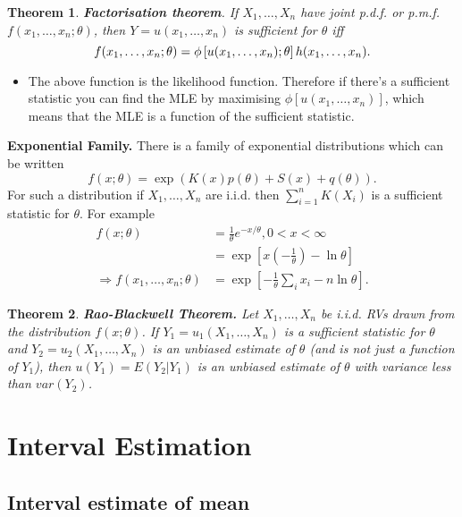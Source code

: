 \documentclass[10pt, two column]{article}
\newtheorem{theorem}{Theorem}[subsection]
\begin{document}
\begin{theorem}
{\bf Factorisation theorem}. If $X_{1}, \dots, X_{n}$ have joint p.d.f. or p.m.f. $f(x_{1}, \dots, x_{n}; \theta)$, then $Y = u(x_{1}, \dots, x_{n})$ is sufficient for $\theta$ iff \vspace{-6pt}
\[ f(x_{1}, \dots, x_{n}; \theta) = \phi \left[ u(x_{1}, \dots, x_{n}); \theta \right] h(x_{1}, \dots, x_{n}). \vspace{-6pt} \]
\end{theorem}
\begin{itemize}
\item The above function is the likelihood function. Therefore if there's a sufficient statistic you can find the MLE by maximising $\phi \left[ u(x_{1}, \dots, x_{n}) \right]$, which means that the MLE is a function of the sufficient statistic. 
\end{itemize}

{\bf Exponential Family.} There is a family of exponential distributions which can be written
\[f(x; \theta) = \exp (K(x)p(\theta) + S(x) + q(\theta)).\]
For such a distribution if $X_{1}, \dots, X_{n}$ are i.i.d. then $\sum_{i=1}^{n} K(X_{i})$ is a sufficient statistic for $\theta$. For example 
\begin{align*}
f(x;\theta) &= \frac{1}{\theta}e^{-x/\theta}, 0 < x < \infty \\
&= \exp \left[x \left( - \frac{1}{\theta} \right) - \ln \theta \right] \\
\Rightarrow f(x_{1}, \dots, x_{n};\theta) &= \exp \left[ - \frac{1}{\theta} \sum_{i} x_{i} - n \ln \theta  \right].
\end{align*}

\begin{theorem}
{\bf Rao-Blackwell Theorem.} Let $X_{1}, \dots, X_{n}$ be i.i.d. RVs drawn from the distribution $f(x; \theta)$. If $Y_{1} = u_{1}(X_{1}, \dots, X_{n})$ is a sufficient statistic for $\theta$ and $Y_{2} = u_{2}(X_{1}, \dots, X_{n})$ is an unbiased estimate of $\theta$ (and is not just a function of $Y_{1}$), then $u(Y_{1}) = E(Y_{2} \vert Y_{1})$ is an unbiased estimate of $\theta$ with variance less than $var(Y_{2})$. \\
\end{theorem}

\section{Interval Estimation}

\subsection{Interval estimate of mean} 
\end{document}
